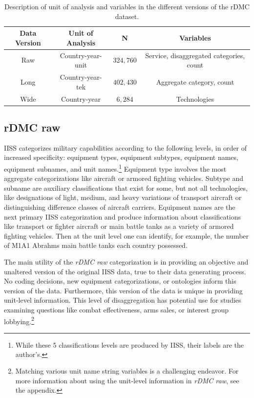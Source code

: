 \documentclass[
]{article}
\begin{document}
\begin{singlespace}   
    \begin{table}[h]
        \centering              
        \caption[Categories of military capabilities]{Description of unit of analysis and variables in the different versions of the rDMC dataset.}
    \begin{tabular}{|c|c|c|c|}
            \hline
            \textbf{Data Version} & \textbf{Unit of Analysis} & \textbf{N} & \textbf{Variables} \\
            \hline
            Raw & Country-year-unit & $324,760$ & Service, disaggregated categories, count \\
            \hline
            Long & Country-year-tek & $402,430$ & Aggregate category, count \\
            \hline
            Wide & Country-year & $6,284$ & Technologies \\
            \hline
        \end{tabular}
        \label{table:categories}
    \end{table}
    \end{singlespace}

\hypertarget{rdmc-raw}{%
\subsection{rDMC raw}\label{rdmc-raw}}

IISS categorizes military capabilities according to the following levels, in order of increased specificity: equipment types, equipment subtypes, equipment names, equipment subnames, and unit names.\footnote{While these 5 classifications levels are produced by IISS, their labels are the author's.} Equipment type involves the most aggregate categorizations like aircraft or armored fighting vehicles. Subtype and subname are auxiliary classifications that exist for some, but not all technologies, like designations of light, medium, and heavy variations of transport aircraft or distinguishing difference classes of aircraft carriers. Equipment names are the next primary IISS categorization and produce information about classifications like transport or fighter aircraft or main battle tanks as a variety of armored fighting vehicles. Then at the unit level one can identify, for example, the number of M1A1 Abrahms main battle tanks each country possessed.

The main utility of the \textit{rDMC raw} categorization is in providing an objective and unaltered version of the original IISS data, true to their data generating process. No coding decisions, new equipment categorizations, or ontologies inform this version of the data. Furthermore, this version of the data is unique in providing unit-level information. This level of disaggregation has potential use for studies examining questions like combat effectiveness, arms sales, or interest group lobbying.\footnote{Matching various unit name string variables is a challenging endeavor. For more information about using the unit-level information in \textit{rDMC raw}, see the appendix.}
\end{document}
